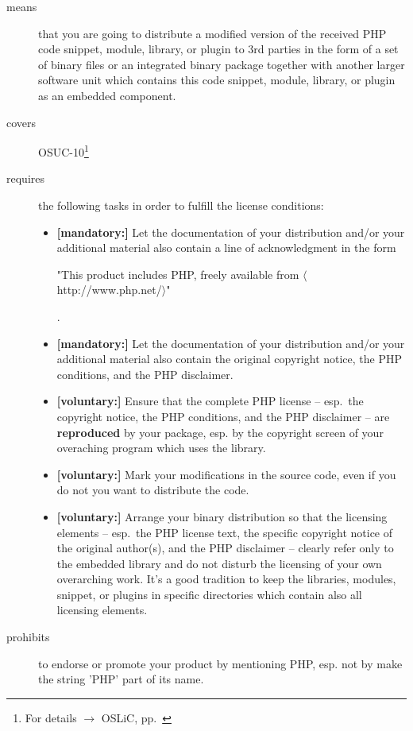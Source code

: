 \begin{description}
\item[means] that you are going to distribute a modified version of the received
PHP code snippet, module, library, or plugin to 3rd parties in the form of a set of
binary files or an integrated binary package together with another larger
software unit which contains this code snippet, module, library, or plugin as
an embedded component.
\item[covers] OSUC-10\footnote{For details $\rightarrow$ OSLiC, pp.\ \pageref{OSUC-10-DEF}}
\item[requires] the following tasks in order to fulfill the license conditions:
\begin{itemize}

  \item \textbf{[mandatory:]} Let the documentation of your distribution and/or
  your additional material also contain a line of acknowledgment in the form
  \begin{footnotesize}"This product includes PHP, freely available from
  $\langle$http://www.php.net/$\rangle$"\end{footnotesize}.
    
  \item \textbf{[mandatory:]} Let the documentation of your distribution and/or
  your additional material also contain the original copyright notice, the PHP
  conditions, and the PHP disclaimer.

  \item \textbf{[voluntary:]} Ensure that the complete PHP license -- esp.\ the
  copyright notice, the PHP conditions, and the PHP disclaimer -- are
  \textbf{reproduced} by your package, esp. by the copyright screen of your
  overaching program which uses the library.
    
  \item \textbf{[voluntary:]} Mark your modifications in the source code,
  even if you do not you want to distribute the code.
  
  \item \textbf{[voluntary:]} Arrange your binary distribution so that the
  licensing elements -- esp.\ the PHP license text, the specific copyright
  notice of the original author(s), and the PHP disclaimer -- clearly refer
  only to the embedded library and do not disturb the licensing of your own
  overarching work. It's a good tradition to keep the libraries, modules,
  snippet, or plugins in specific directories which contain also all licensing
  elements.
\end{itemize}

\item[prohibits] to endorse or promote your product by mentioning PHP, esp. not
by make the string 'PHP' part of its name.

\end{description}

